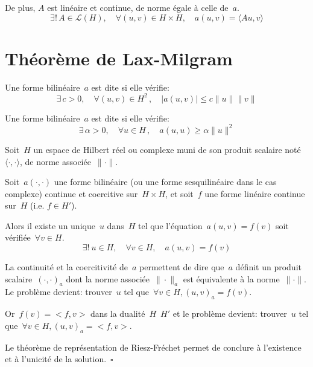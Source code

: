 De plus, $A$ est linéaire et continue, de norme égale à celle de~$a$.
\begin{equation}
\exists !\,A\in \mathcal{L}(H),\quad \forall (u,v)\in H\times H,\quad a(u,v)=\langle Au,v \rangle
\end{equation}

\medskip
\section{Théorème de Lax-Milgram}\label{Sec-ThLaxMilgram}\label{Sec:LaxMil}

\medskip
\begin{definition}
Une forme bilinéaire~$a$ est dite  si elle vérifie:
\begin{equation}
\exists\,c>0,\quad \forall (u,v)\in H^2\,,\quad |a(u,v)|\leq c\|u\|\|v\|
\end{equation}
\end{definition}

\medskip
\begin{definition}
Une forme bilinéaire~$a$ est dite  si elle vérifie:
\begin{equation}
\exists\,\alpha>0,\quad \forall u\in H\,,\quad a(u,u) \geq \alpha\|u\|^2
\end{equation}
\end{definition}

\medskip
\begin{theoreme}
Soit~$H$ un espace de Hilbert réel ou complexe muni de son produit scalaire noté $\langle\cdot,\cdot\rangle$, de norme associée~$\|\cdot\|$.

Soit~$a(\cdot,\cdot)$ une forme bilinéaire (ou une forme sesquilinéaire dans le cas complexe) continue et coercitive sur~$H\times H$, et soit~$f$ une forme linéaire continue sur~$H$ (i.e. $f\in H'$).

Alors il existe un unique~$u$ dans~$H$ tel que l'équation~$a(u,v) = f(v)$ soit vérifiée~$\forall v \in H$.
\begin{equation}
  \exists!\ u \in H,\quad \forall v\in H,\quad a(u,v)=f(v)
\end{equation}
\end{theoreme}

\medskip
\begin{demonstration}\footnotesize{}
La continuité et la coercitivité de~$a$ permettent de dire que~$a$ définit un produit scalaire~$(\cdot,\cdot)_a$ dont la norme associée~$\|\cdot\|_a$ est équivalente à la norme~$\|\cdot\|$. 
Le problème devient: trouver~$u$ tel que~$\forall v\in H, (u,v)_a=f(v)$.

Or~$f(v)=<f,v>$ dans la dualité~$H$~$H'$ et le problème devient:
trouver~$u$ tel que~$\forall v\in H, (u,v)_a=<f,v>$.

Le théorème de représentation de Riesz-Fréchet permet de conclure à l'existence et à l'unicité de la solution.~$\square$
\end{demonstration}

